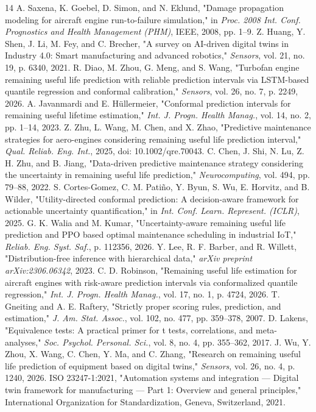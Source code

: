 \documentclass[12pt,a4paper]{article}
\begin{document}
\begin{thebibliography}{14}
 A. Saxena, K. Goebel, D. Simon, and N. Eklund, "Damage propagation modeling for aircraft engine run-to-failure simulation," in \textit{Proc. 2008 Int. Conf. Prognostics and Health Management (PHM)}, IEEE, 2008, pp. 1--9.
 Z. Huang, Y. Shen, J. Li, M. Fey, and C. Brecher, "A survey on AI-driven digital twins in Industry 4.0: Smart manufacturing and advanced robotics," \textit{Sensors}, vol. 21, no. 19, p. 6340, 2021.
 R. Diao, M. Zhou, G. Meng, and S. Wang, "Turbofan engine remaining useful life prediction with reliable prediction intervals via LSTM-based quantile regression and conformal calibration," \textit{Sensors}, vol. 26, no. 7, p. 2249, 2026.
 A. Javanmardi and E. H{\"u}llermeier, "Conformal prediction intervals for remaining useful lifetime estimation," \textit{Int. J. Progn. Health Manag.}, vol. 14, no. 2, pp. 1--14, 2023.
 Z. Zhu, L. Wang, M. Chen, and X. Zhao, "Predictive maintenance strategies for aero-engines considering remaining useful life prediction interval," \textit{Qual. Reliab. Eng. Int.}, 2025, doi: 10.1002/qre.70043.
 C. Chen, J. Shi, N. Lu, Z. H. Zhu, and B. Jiang, "Data-driven predictive maintenance strategy considering the uncertainty in remaining useful life prediction," \textit{Neurocomputing}, vol. 494, pp. 79--88, 2022.
 S. Cortes-Gomez, C. M. Pati{\~n}o, Y. Byun, S. Wu, E. Horvitz, and B. Wilder, "Utility-directed conformal prediction: A decision-aware framework for actionable uncertainty quantification," in \textit{Int. Conf. Learn. Represent. (ICLR)}, 2025.
 G. K. Walia and M. Kumar, "Uncertainty-aware remaining useful life prediction and PPO based optimal maintenance scheduling in industrial IoT," \textit{Reliab. Eng. Syst. Saf.}, p. 112356, 2026.
 Y. Lee, R. F. Barber, and R. Willett, "Distribution-free inference with hierarchical data," \textit{arXiv preprint arXiv:2306.06342}, 2023.
 C. D. Robinson, "Remaining useful life estimation for aircraft engines with risk-aware prediction intervals via conformalized quantile regression," \textit{Int. J. Progn. Health Manag.}, vol. 17, no. 1, p. 4724, 2026.
 T. Gneiting and A. E. Raftery, "Strictly proper scoring rules, prediction, and estimation," \textit{J. Am. Stat. Assoc.}, vol. 102, no. 477, pp. 359--378, 2007.
 D. Lakens, "Equivalence tests: A practical primer for t tests, correlations, and meta-analyses," \textit{Soc. Psychol. Personal. Sci.}, vol. 8, no. 4, pp. 355--362, 2017.
 J. Wu, Y. Zhou, X. Wang, C. Chen, Y. Ma, and C. Zhang, "Research on remaining useful life prediction of equipment based on digital twins," \textit{Sensors}, vol. 26, no. 4, p. 1240, 2026.
 ISO 23247-1:2021, "Automation systems and integration — Digital twin framework for manufacturing — Part 1: Overview and general principles," International Organization for Standardization, Geneva, Switzerland, 2021.
\end{thebibliography}
\end{document}
